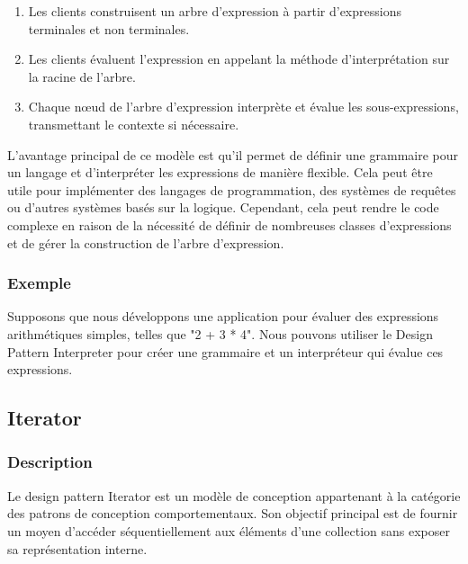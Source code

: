 \begin{enumerate}[leftmargin=*,labelsep=3mm]
    \item Les clients construisent un arbre d'expression à partir d'expressions terminales et non terminales.
    \item Les clients évaluent l'expression en appelant la méthode d'interprétation sur la racine de l'arbre.
    \item Chaque nœud de l'arbre d'expression interprète et évalue les sous-expressions, transmettant le contexte si nécessaire.
\end{enumerate}

L'avantage principal de ce modèle est qu'il permet de définir une grammaire pour un langage et d'interpréter les expressions de manière flexible. Cela peut être utile pour implémenter des langages de programmation, des systèmes de requêtes ou d'autres systèmes basés sur la logique. Cependant, cela peut rendre le code complexe en raison de la nécessité de définir de nombreuses classes d'expressions et de gérer la construction de l'arbre d'expression.


\subsubsection{Exemple}

Supposons que nous développons une application pour évaluer des expressions arithmétiques simples, telles que "2 + 3 * 4". Nous pouvons utiliser le Design Pattern Interpreter pour créer une grammaire et un interpréteur qui évalue ces expressions.





\newpage


\subsection{Iterator}

\subsubsection{Description}

Le design pattern Iterator est un modèle de conception appartenant à la catégorie des patrons de conception comportementaux. Son objectif principal est de fournir un moyen d'accéder séquentiellement aux éléments d'une collection sans exposer sa représentation interne.

